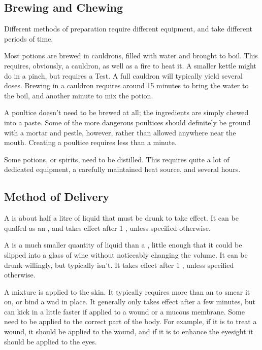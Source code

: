 \subsection{Brewing and Chewing}

Different methods of preparation require different equipment, and take different periods of time.

Most potions are brewed in cauldrons, filled with water and brought to boil.
This requires, obviously, a cauldron, as well as a fire to heat it.
A smaller kettle might do in a pinch, but requires a Test.
A full cauldron will typically yield several doses.
Brewing in a cauldron requires around 15 minutes to bring the water to the boil, and another minute to mix the potion.

A poultice doesn't need to be brewed at all; the ingredients are simply chewed into a paste.
Some of the more dangerous poultices should definitely be ground with a mortar and pestle, however, rather than allowed anywhere near the mouth.
Creating a poultice requires less than a minute.

Some potions, or spirits, need to be distilled.
This requires quite a lot of dedicated equipment, a carefully maintained heat source, and several hours.

\subsection{Method of Delivery}

A  is about half a litre of liquid that must be drunk to take effect.
It can be quaffed as an {\action}, and takes effect after 1 {\round}, unless specified otherwise.

A  is a much smaller quantity of liquid than a , little enough that it could be slipped into a glass of wine without noticeably changing the volume.
It can be drunk willingly, but typically isn't.
It takes effect after 1 {\round}, unless specified otherwise.

A  mixture is applied to the skin.
It typically requires more than an {\action} to smear it on, or bind a wad in place.
It generally only takes effect after a few minutes, but can kick in a little faster if applied to a wound or a mucous membrane.
Some need to be applied to the correct part of the body.
For example, if it is to treat a wound, it should be applied to the wound, and if it is to enhance the eyesight it should be applied to the eyes.

